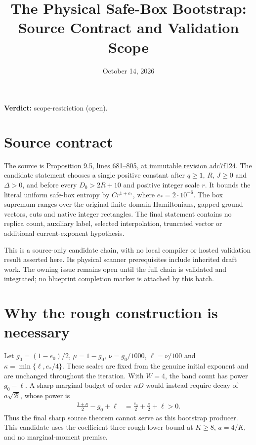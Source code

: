 \documentclass{article}
\title{The Physical Safe-Box Bootstrap: Source Contract and Validation Scope}
\author{}
\date{October 14, 2026}
\providecommand{\gapnote}[2]{%
    \par\noindent\textbf{Verdict:} #1 (#2).\par}
\begin{document}
\maketitle
\gapnote{scope-restriction}{open}

\section{Source contract}
The source is
\href{https://github.com/openai/math/blob/adc7f1241b42e322a6451854ab7e4b4c146bf78a/preprints/A-two-dimensional-area-law-from-a-global-spectral-gap-September-24-2026/build/sections/08-scanner.tex#L681-L805}{Proposition 9.5, lines 681--805, at immutable revision adc7f124}.
The candidate statement chooses a single positive constant after
$q\geq1$, $R$, $J\geq0$ and $\Delta>0$, and before every
$D_0>2R+10$ and positive integer scale $r$.
It bounds the literal uniform safe-box entropy by $Cr^{1+e_*}$,
where $e_*=2\cdot10^{-6}$.
The box supremum ranges over the original finite-domain Hamiltonians,
gapped ground vectors, cuts and native integer rectangles.
The final statement contains no replica count, auxiliary label, selected
interpolation, truncated vector or additional current-exponent hypothesis.

This is a source-only candidate chain, with no local compiler or hosted
validation result asserted here.  Its physical scanner prerequisites
include inherited draft work.  The owning issue remains open until the
full chain is validated and integrated; no blueprint completion marker
is attached by this batch.

\section{Why the rough construction is necessary}
Let $g_0=(1-e_0)/2$, $\mu=1-g_0$, $\nu=g_0/1000$,
$\ell=\nu/100$ and $\kappa=\min\{\ell,e_*/4\}$.
These scales are fixed from the genuine initial exponent and are unchanged
throughout the iteration.
With $W=4$, the band count has power $g_0-\ell$.
A sharp marginal budget of order $nD$ would instead require decay of
$a\sqrt{\mathcal B}$, whose power is
\begin{align}
    \frac{1+\kappa}{2}-g_0+\ell
      &=\frac{e_0}{2}+\frac{\kappa}{2}+\ell>0.
    \label{eq:physical_box_sharp_obstruction}
\end{align}
Thus the final sharp source theorem cannot serve as this bootstrap
producer.  This candidate uses the coefficient-three rough lower bound
at $K\geq8$, $a=4/K$, and no marginal-moment premise.
\end{document}
